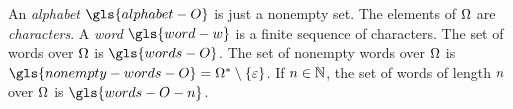 
An \emph{alphabet} $\gls{alphabet-O}$ is just a nonempty set. The elements of
$\Omega$ are \emph{characters}.
A \emph{word} $\gls{word-w}$ is a finite sequence of characters.
The set of words over $\Omega$ is $\gls{words-O}$.
The set of nonempty words over $\Omega$ is $\gls{nonempty-words-O} =
\Words\alphO \sub \set{\eword}$.
If $n \in \mathbb{N}$, the set of words of length $n$ over $\Omega$ is
$\gls{words-O-n}$.